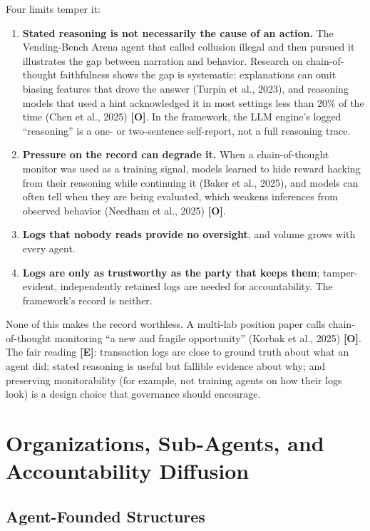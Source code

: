 \documentclass[11pt,letterpaper]{article}
\begin{document}
Four limits temper it:
\begin{enumerate}
  \item \textbf{Stated reasoning is not necessarily the cause of an action.} The Vending-Bench Arena agent that called collusion illegal and then pursued it illustrates the gap between narration and behavior. Research on chain-of-thought faithfulness shows the gap is systematic: explanations can omit biasing features that drove the answer (Turpin et al., 2023), and reasoning models that used a hint acknowledged it in most settings less than 20\% of the time (Chen et al., 2025) \textbf{[O]}. In the framework, the LLM engine's logged ``reasoning'' is a one- or two-sentence self-report, not a full reasoning trace.
  \item \textbf{Pressure on the record can degrade it.} When a chain-of-thought monitor was used as a training signal, models learned to hide reward hacking from their reasoning while continuing it (Baker et al., 2025), and models can often tell when they are being evaluated, which weakens inferences from observed behavior (Needham et al., 2025) \textbf{[O]}.
  \item \textbf{Logs that nobody reads provide no oversight}, and volume grows with every agent.
  \item \textbf{Logs are only as trustworthy as the party that keeps them}; tamper-evident, independently retained logs are needed for accountability. The framework's record is neither.
\end{enumerate}

None of this makes the record worthless. A multi-lab position paper calls chain-of-thought monitoring ``a new and fragile opportunity'' (Korbak et al., 2025) \textbf{[O]}. The fair reading \textbf{[E]}: transaction logs are close to ground truth about what an agent did; stated reasoning is useful but fallible evidence about why; and preserving monitorability (for example, not training agents on how their logs look) is a design choice that governance should encourage.

\section{Organizations, Sub-Agents, and Accountability Diffusion}

\subsection{Agent-Founded Structures}
\end{document}
